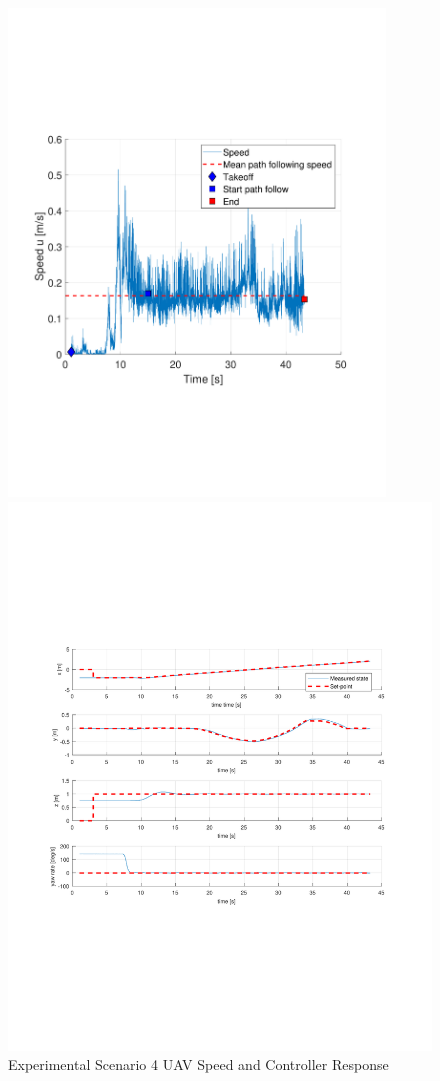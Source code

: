 \documentclass[numbered,pdftex]{ohio-etd}
\begin{document}
\pagebreak
\begin{figure}[H]
	\centering
	\includegraphics[trim = 0 150 0 200, clip, width=10cm]{Figures/results/compareFigures/4u}
	
	\centering
	\includegraphics[trim = 65 210 0 200, clip, width=16cm]{Figures/results/compareFigures/4Controller}
	\caption{Experimental Scenario 4 UAV Speed and Controller Response}
	\label{fig:4Controller}
\end{figure}
\end{document}

